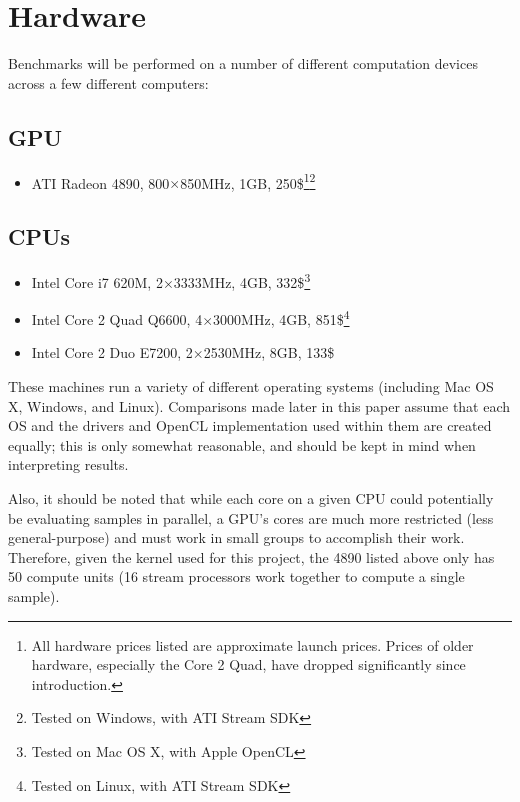 \documentclass{acmsiggraph}
\begin{document}
\section{Hardware}

Benchmarks will be performed on a number of different computation devices across a few different computers:

\subsection{GPU}

\begin{itemize}

\item ATI Radeon 4890, 800$\times$850MHz, 1GB, 250\$\footnote{All hardware prices listed are approximate launch prices. Prices of older hardware, especially the Core 2 Quad, have dropped significantly since introduction.\label{fn:prices}}\footnote{Tested on Windows, with ATI Stream SDK\label{fn:windows}}

\end{itemize}

\subsection{CPUs}

\begin{itemize}

\item Intel Core i7 620M, 2$\times$3333MHz, 4GB, 332\$\footnote{Tested on Mac OS X, with Apple OpenCL\label{fn:osx}}

\item Intel Core 2 Quad Q6600, 4$\times$3000MHz, 4GB, 851\$\footnote{Tested on Linux, with ATI Stream SDK\label{fn:linux}}

\item Intel Core 2 Duo E7200, 2$\times$2530MHz, 8GB, 133\$

\end{itemize}

These machines run a variety of different operating systems (including Mac OS X, Windows, and Linux). Comparisons made later in this paper assume that each OS and the drivers and OpenCL implementation used within them are created equally; this is only somewhat reasonable, and should be kept in mind when interpreting results.

Also, it should be noted that while each core on a given CPU could potentially be evaluating samples in parallel, a GPU's cores are much more restricted (less general-purpose) and must work in small groups to accomplish their work. Therefore, given the kernel used for this project, the 4890 listed above only has 50 compute units (16 stream processors work together to compute a single sample).
\end{document}
